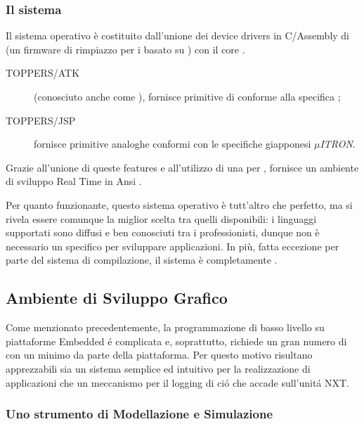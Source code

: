 \subsubsection{Il sistema \nxtOSEK}

Il sistema operativo \nxtOSEK{}\cite{bib:nxtosek} \`e costituito
dall'unione dei device drivers in C/Assembly di  (un
firmware di rimpiazzo per i \nxt{} basato su ) con il core
.

\begin{description}
    \item[TOPPERS/ATK](conosciuto anche come ), 
        fornisce primitive di 
        conforme alla specifica ;
    \item[TOPPERS/JSP]fornisce primitive analoghe conformi con le
        specifiche giapponesi \emph{$\mu$ITRON}\cite{bib:muitron}.
\end{description}

Grazie all'unione di queste features e all'utilizzo di una
  per ,
 fornisce un ambiente di sviluppo Real Time in Ansi
.

Per quanto funzionante, questo sistema operativo \`e tutt'altro che
perfetto, ma si rivela essere comunque la miglior scelta tra quelli
disponibili: i linguaggi supportati sono diffusi e ben conosciuti tra i
professionisti, dunque non \`e necessario un 
specifico per sviluppare applicazioni. In pi\`u, fatta eccezione per parte
del sistema di compilazione, il sistema \`e completamente
.

\subsection{Ambiente di Sviluppo Grafico}

Come menzionato precedentemente, la programmazione di basso livello su
piattaforme Embedded \'e complicata e, soprattutto, richiede un gran
numero di  con un 
minimo da parte della piattaforma. Per questo motivo risultano
apprezzabili sia un sistema semplice ed intuitivo per la realizzazione di
applicazioni che un meccanismo per il logging di ci\'o che accade
sull'unit\'a NXT.

\subsubsection{Uno strumento di Modellazione e Simulazione}

